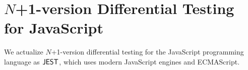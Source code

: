 \section{$N$+1-version Differential Testing for JavaScript}
\label{sec:application}
We actualize $N$+1-version differential testing for the JavaScript programming
language as $\tool$, which uses modern JavaScript engines and ECMAScript.






